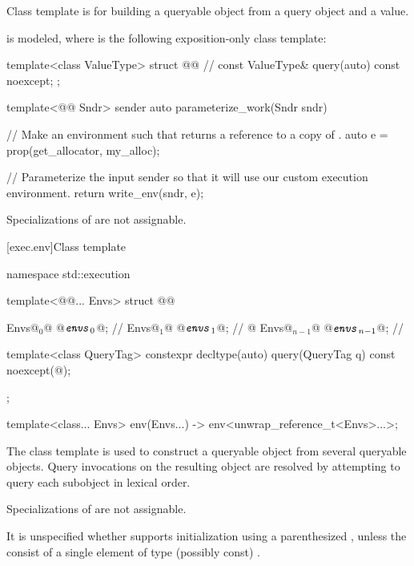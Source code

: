 \pnum
Class template  is for building a queryable object
from a query object and a value.

\pnum
\mandates
{}
is modeled,
where  is the following exposition-only class template:
\begin{codeblock}
template<class ValueType>
struct @@ {              // \expos
  const ValueType& query(auto) const noexcept;
};
\end{codeblock}

\pnum
\begin{example}
\begin{codeblock}
template<@@ Sndr>
sender auto parameterize_work(Sndr sndr) {
  // Make an environment such that  returns a reference to a copy of .
  auto e = prop(get_allocator, my_alloc{});

  // Parameterize the input sender so that it will use our custom execution environment.
  return write_env(sndr, e);
}
\end{codeblock}
\end{example}

\pnum
Specializations of  are not assignable.

[exec.env]{Class template }

\begin{codeblock}
namespace std::execution {
  template<@@... Envs>
  struct @@ {
    Envs@$_0$@ @$\texttt{\protect\textit{envs}}_0$@;               // \expos
    Envs@$_1$@ @$\texttt{\protect\textit{envs}}_1$@;               // \expos
      @\vdots@
    Envs@$_{n-1}$@ @$\texttt{\protect\textit{envs}}_{n-1}$@;           // \expos

    template<class QueryTag>
      constexpr decltype(auto) query(QueryTag q) const noexcept(@\seebelow@);
  };

  template<class... Envs>
    env(Envs...) -> env<unwrap_reference_t<Envs>...>;
}
\end{codeblock}

\pnum
The class template  is used to construct a queryable object
from several queryable objects.
Query invocations on the resulting object are resolved
by attempting to query each subobject in lexical order.

\pnum
Specializations of  are not assignable.

\pnum
It is unspecified
whether  supports initialization
using a parenthesized ,
unless the  consist of
a single element of type (possibly const) .

